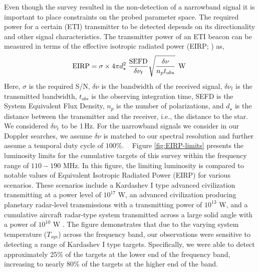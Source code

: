 Even though the survey resulted in the non-detection of a narrowband signal it is important to place constraints on the probed parameter space. The required power for a certain  (ETI) transmitter to be detected depends on its directionality and other signal characteristics. 
The transmitter power of an ETI beacon can be measured in terms of the effective isotropic radiated power (EIRP; \citealt{Enriquez2017ApJ}) as,
\begin{equation}
    {\rm EIRP} = \sigma \times {4 \pi d_\star^2} \;\frac{{\rm SEFD}}{\delta{\nu_t}}\sqrt{\frac{\delta{\nu}}{n_{p}t_{obs}}}  \>\> \mathrm{W}\;
    \label{Eq:EIRP}
\end{equation}
Here, $\sigma$ is the required S/N, $\delta{\nu}$ is the bandwidth of the received signal, 
$\delta{\nu}_{t}$ is the transmitted bandwidth, $t_{obs}$ is the observing integration time, SEFD is the System Equivalent Flux Density, $n_p$ is the number of polarizations, 
and $d_\star$ is the distance between the transmitter and the receiver, i.e., the distance to the star. We considered $\delta{\nu}_{t}$ to be 1\,Hz. For the narrowband signals we consider in our Doppler searches, we assume $\delta{\nu}$ is matched to our spectral resolution and further assume a temporal duty cycle of $100\%$. \ 
Figure \ref{fig:EIRP-limits} presents the luminosity limits for the cumulative targets of this survey within the frequency range of $110-190$ MHz. In this figure, the limiting luminosity is compared to notable values of Equivalent Isotropic Radiated Power (EIRP) for various scenarios. These scenarios include a Kardashev I type advanced civilization transmitting at a power level of $10^{17}$ W, an advanced civilization producing planetary radar-level transmissions with a transmitting power of $10^{13}$ W, and a cumulative aircraft radar-type system transmitted across a large solid angle with a power of $10^{10}$ W \citep{Siemion_KEPLER_ApJ}. The figure demonstrates that due to the varying system temperature ($T_{sys}$) across the frequency band, our observations were sensitive to detecting a range of Kardashev I type targets. Specifically, we were able to detect approximately 25\% of the targets at the lower end of the frequency band, increasing to nearly 80\% of the targets at the higher end of the band.

